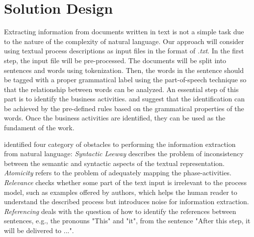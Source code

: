 \chapter{Solution Design}
\label{sec:solution}


Extracting information from documents written in text is not a simple task due to the nature of the complexity of natural language. Our approach will consider using textual process descriptions as input files in the format of \textit{.txt}. In the first step, the input file will be pre-processed. The documents will be split into sentences and words using tokenization. Then, the words in the sentence should be tagged with a proper grammatical label using the part-of-speech technique so that the relationship between words can be analyzed. An essential step of this part is to identify the business activities. \cite{t2m_5} and \cite{complement_1} suggest that the identification can be achieved by the pre-defined rules based on the grammatical properties of the words. Once the business activities are identified, they can be used as the fundament of the work.

\cite{t2m_1} identified four category of obstacles to performing the information extraction from natural language: \textit{Syntactic Leeway} describes the problem of inconsistency between the semantic and syntactic aspects of the textual representation. \textit{Atomicity} refers to the problem of adequately mapping the phase-activities. \textit{Relevance} checks whether some part of the text input is irrelevant to the process model, such as examples offered by authors, which helps the human reader to understand the described process but introduces noise for information extraction. \textit{Referencing} deals with the question of how to identify the references between sentences, e.g., the pronouns "This" and "it", from the sentence "After this step, it will be delivered to ...".


